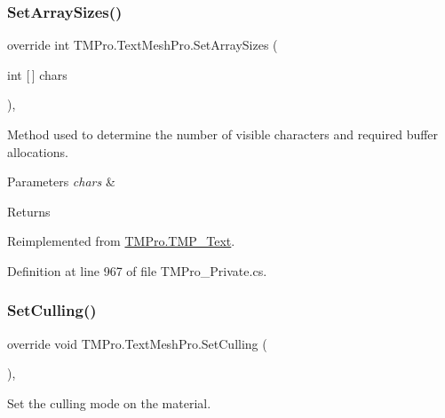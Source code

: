 \subsubsection{\texorpdfstring{SetArraySizes()}{SetArraySizes()}}
{\footnotesize\ttfamily override int T\+M\+Pro.\+Text\+Mesh\+Pro.\+Set\+Array\+Sizes (\begin{DoxyParamCaption}\item[{int \mbox{[}$\,$\mbox{]}}]{chars }\end{DoxyParamCaption})\hspace{0.3cm}{\ttfamily [protected]}, {\ttfamily [virtual]}}



Method used to determine the number of visible characters and required buffer allocations. 


\begin{DoxyParams}{Parameters}
{\em chars} & \\
\hline
\end{DoxyParams}
\begin{DoxyReturn}{Returns}

\end{DoxyReturn}


Reimplemented from \mbox{\hyperlink{class_t_m_pro_1_1_t_m_p___text_afb0b5462b35a2486f6e976c2a278702f}{T\+M\+Pro.\+T\+M\+P\+\_\+\+Text}}.



Definition at line 967 of file T\+M\+Pro\+\_\+\+Private.\+cs.

\mbox{\label{class_t_m_pro_1_1_text_mesh_pro_a0754ccdc79d70ff05ffaf120bf766c4b}} 
\subsubsection{\texorpdfstring{SetCulling()}{SetCulling()}}
{\footnotesize\ttfamily override void T\+M\+Pro.\+Text\+Mesh\+Pro.\+Set\+Culling (\begin{DoxyParamCaption}{ }\end{DoxyParamCaption})\hspace{0.3cm}{\ttfamily [protected]}, {\ttfamily [virtual]}}



Set the culling mode on the material. 



